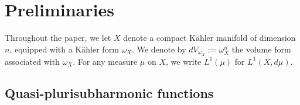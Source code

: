 \documentclass[a4paper,11pt]{amsart}
\numberwithin{equation}{section}
\theoremstyle{definition}
\begin{document}
\section{Preliminaries} 
Throughout the paper, we let $X$ denote a compact K\"ahler manifold of dimension $n$, equipped with a K\"ahler form $\omega_X$. 
We denote by \(dV_{\omega_X}:={\omega_X^n} \)
the volume form associated with $\omega_X$. For any measure $\mu$ on $X$, we write $L^1(\mu)$ for $L^1(X,d\mu)$.

\subsection{Quasi-plurisubharmonic functions}
\end{document}
